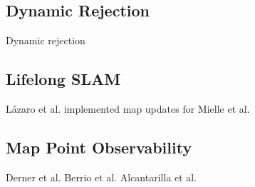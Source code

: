 \subsection{Dynamic Rejection}

Dynamic rejection 

\subsection{Lifelong SLAM}
Lázaro et al. \cite{lazaroEfficientLongtermMapping2018} implemented map updates for
Mielle et al. \cite{mielleSLAMAutocompleteCompleting2017}

\subsection{Map Point Observability}
Derner et al. \cite{dernerChangeDetectionUsing2021}
Berrio et al. \cite{berrioUpdatingVisibilityFeaturebased2019}\cite{berrioLongtermMapMaintenance2020}
Alcantarilla et al. \cite{alcantarillaLearningVisibilityLandmarks2010}